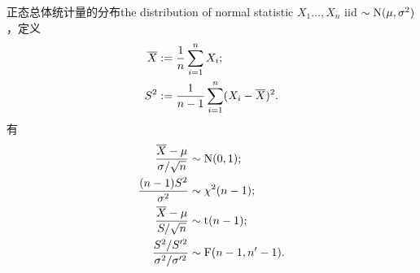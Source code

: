 \begin{theorem}{正态总体统计量的分布}{the distribution of normal statistic}
	$X_1\ldots,X_n$ iid $\sim \operatorname{N}(\mu,\sigma^2)$，定义
	\begin{subequations}
		\begin{align}
			\overline{X} &:= \frac1n\sum_{i=1}^nX_i;\\
			S^2 &:= \frac1{n - 1}\sum_{i=1}^n(X_i - \overline{X})^2.
		\end{align}
	\end{subequations}
	有
	\begin{subequations}
		\begin{align}
			\label{sample-N}
			\frac{\overline{X} - \mu}{\sigma/\sqrt n} &\sim \operatorname{N}(0,1);\\
			\label{sample-chi2}
			\frac{(n - 1)S^2}{\sigma^2} &\sim \chi^2(n - 1);\\
			\label{sample-t}
			\frac{\overline{X} - \mu}{S/\sqrt n} &\sim \operatorname{t}(n - 1);\\
			\label{2sample-F}
			\frac{S^2/S'^2}{\sigma^2/\sigma'^2} &\sim \operatorname{F}(n - 1,n' - 1).
		\end{align}
	\end{subequations}
\end{theorem}
